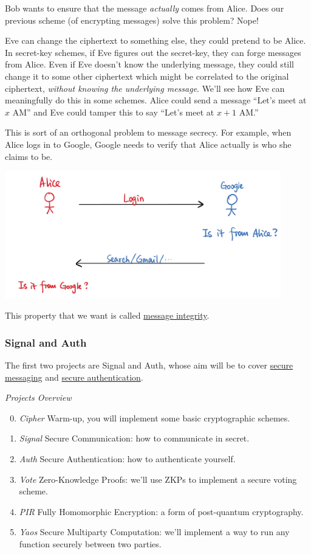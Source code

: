 Bob wants to ensure that the message \emph{actually} comes from Alice. Does our previous scheme (of encrypting messages) solve this problem? Nope!

Eve can change the ciphertext to something else, they could pretend to be Alice. In secret-key schemes, if Eve figures out the secret-key, they can forge messages from Alice. Even if Eve doesn't know the underlying message, they could still change it to some other ciphertext which might be correlated to the original ciphertext, \emph{without knowing the underlying message}. We'll see how Eve can meaningfully do this in some schemes. Alice could send a message ``Let's meet at $x$ AM'' and Eve could tamper this to say ``Let's meet at $x+1$ AM.''

This is sort of an orthogonal problem to message secrecy. For example, when Alice logs in to Google, Google needs to verify that Alice actually is who she claims to be.

\begin{center}
    \includegraphics[width=0.9\textwidth]{images/2023-01-26/authentication.png}
\end{center}

This property that we want is called \ul{message integrity}.

\subsubsection{Signal and Auth}

The first two projects are Signal and Auth, whose aim will be to cover \ul{secure messaging} and \ul{secure authentication}.

\emph{Projects Overview}
\begin{enumerate}
    \setcounter{enumi}{-1}
    \item \emph{Cipher} Warm-up, you will implement some basic cryptographic schemes.
    \item \emph{Signal} Secure Communication: how to communicate in secret.
    \item \emph{Auth} Secure Authentication: how to authenticate yourself.
    \item \emph{Vote} Zero-Knowledge Proofs: we'll use ZKPs to implement a secure voting scheme.
    \item \emph{PIR} Fully Homomorphic Encryption: a form of post-quantum cryptography.
    \item \emph{Yaos} Secure Multiparty Computation: we'll implement a way to run any function securely between two parties.
\end{enumerate}


